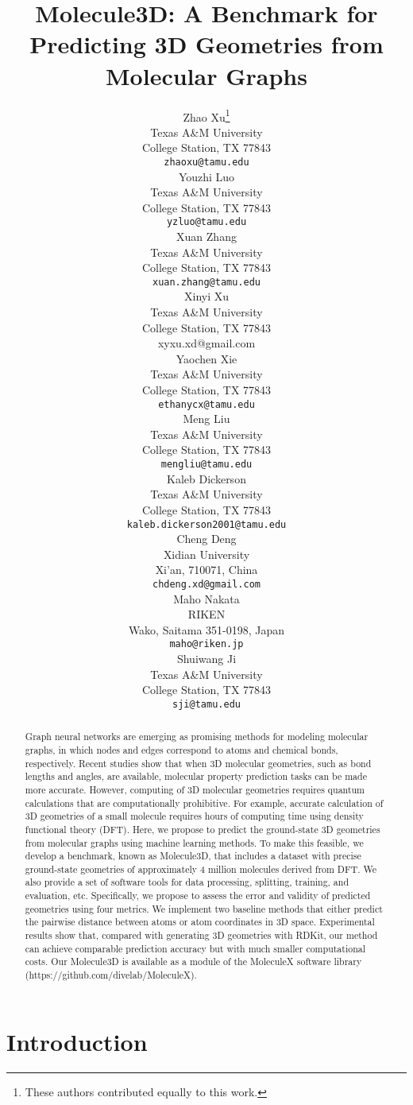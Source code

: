\documentclass{article}
\title{Molecule3D: A Benchmark for Predicting 3D Geometries from Molecular Graphs}
\author{Zhao Xu\thanks{These authors contributed equally to this work.}\\
  Texas A\&M University\\
  College Station, TX 77843 \\
  \texttt{zhaoxu@tamu.edu} \\
\And
  Youzhi Luo\samethanks\\
  Texas A\&M University\\
  College Station, TX 77843 \\
  \texttt{yzluo@tamu.edu} \\
  \And
  Xuan Zhang\\
  Texas A\&M University\\
  College Station, TX 77843 \\
  \texttt{xuan.zhang@tamu.edu} \\
  \And
  Xinyi Xu \\
  Texas A\&M University \\
  College Station, TX 77843 \\
  xyxu.xd@gmail.com \\ 
  \And
  Yaochen Xie \\
  Texas A\&M University\\
  College Station, TX 77843 \\
  \texttt{ethanycx@tamu.edu} \\
  \And
  Meng Liu \\
  Texas A\&M University\\
  College Station, TX 77843 \\
  \texttt{mengliu@tamu.edu} \\
  \And
  Kaleb Dickerson \\
  Texas A\&M University\\
  College Station, TX 77843 \\
  \texttt{\small{kaleb.dickerson2001@tamu.edu}} \\
  \And
  Cheng Deng \\
  Xidian University \\
  Xi'an, 710071, China\\
  \texttt{chdeng.xd@gmail.com} \\
  \And
  Maho Nakata \\
  RIKEN \\
  Wako, Saitama 351-0198, Japan \\
  \texttt{maho@riken.jp} \\
  \And
  Shuiwang Ji \\
  Texas A\&M University\\
  College Station, TX 77843 \\
  \texttt{sji@tamu.edu} \\
}
\begin{document}
\maketitle

\begin{abstract}
Graph neural networks are emerging as promising methods for modeling molecular graphs, in which nodes and edges correspond to atoms and chemical bonds, respectively. Recent studies show that when 3D molecular geometries, such as bond lengths and angles, are available, molecular property prediction tasks can be made more accurate. However, computing of 3D molecular geometries requires quantum calculations that are computationally prohibitive. For example, accurate calculation of 3D geometries of a small molecule requires hours of computing time using density functional theory (DFT). Here, we propose to predict the ground-state 3D geometries from molecular graphs using machine learning methods. To make this feasible, we develop a benchmark, known as Molecule3D, that includes a dataset with precise ground-state geometries of approximately 4 million molecules derived from DFT. We also provide a set of software tools for data processing, splitting, training, and evaluation, etc. Specifically, we propose to assess the error and validity of predicted geometries using four metrics. We implement two baseline methods that either predict the pairwise distance between atoms or atom coordinates in 3D space. Experimental results show that, compared with generating 3D geometries with RDKit, our method can achieve comparable prediction accuracy but with much smaller computational costs. Our Molecule3D is available as a module of the MoleculeX software library (https://github.com/divelab/MoleculeX).
\end{abstract}

\section{Introduction}
\end{document}
